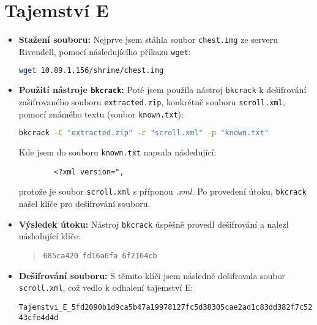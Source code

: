 \documentclass{article}
\begin{document}
\section{Tajemství E}
\begin{itemize}
    \item \textbf{Stažení souboru:} 
    Nejprve jsem stáhla soubor \texttt{chest.img} ze serveru Rivendell, pomocí následujícího příkazu \texttt{wget}:
    \begin{lstlisting}[language=bash]
    wget 10.89.1.156/shrine/chest.img
    \end{lstlisting}

    \item \textbf{Použití nástroje \texttt{bkcrack}:} 
    Poté jsem použila nástroj \texttt{bkcrack} k dešifrování zašifrovaného souboru \texttt{extracted.zip}, konkrétně souboru \texttt{scroll.xml}, pomocí známého textu (soubor \texttt{known.txt}):
    \begin{lstlisting}[language=bash]
    bkcrack -C "extracted.zip" -c "scroll.xml" -p "known.txt"
    \end{lstlisting}
    Kde jsem do souboru \texttt{known.txt} napsala následující:
    \begin{lstlisting}
        <?xml version=",
    \end{lstlisting}
    protože je soubor \texttt{scroll.xml} s příponou \textit{.xml.}
    Po provedení útoku, \texttt{bkcrack} našel klíče pro dešifrování souboru.

    \item \textbf{Výsledek útoku:} 
    Nástroj \texttt{bkcrack} úspěšně provedl dešifrování a nalezl následující klíče:
    \begin{quote}
    \texttt{685ca420 fd16a6fa 6f2164cb}
    \end{quote}

    \item \textbf{Dešifrování souboru:} 
    S těmito klíči jsem následně dešifrovala soubor \texttt{scroll.xml}, což vedlo k odhalení tajemství E:
    \begin{center}
    \texttt{Tajemstvi\_E\_5fd2090b1d9ca5b47a19978127fc5d38305cae2ad1c83dd382f7c5243cfe4d4d}
    \end{center}
\end{itemize}
\end{document}
